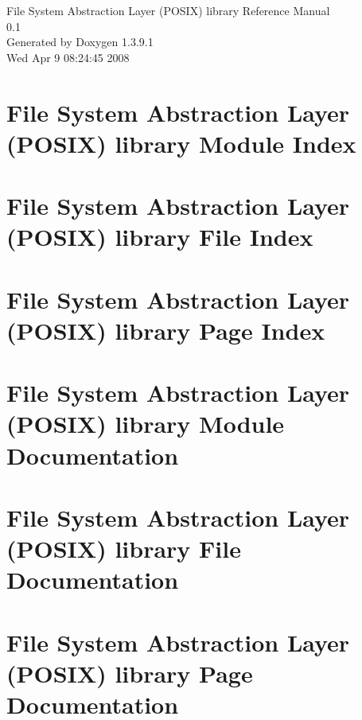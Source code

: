 \documentclass[a4paper]{book}
\begin{document}
\begin{titlepage}
\vspace*{7cm}
\begin{center}
{\Large File System Abstraction Layer (POSIX) library Reference Manual\\[1ex]\large 0.1 }\\
\vspace*{1cm}
{\large Generated by Doxygen 1.3.9.1}\\
\vspace*{0.5cm}
{\small Wed Apr 9 08:24:45 2008}\\
\end{center}
\end{titlepage}
\clearemptydoublepage
{}
\tableofcontents
\clearemptydoublepage
{}
\chapter{File System Abstraction Layer (POSIX) library Module Index}

\chapter{File System Abstraction Layer (POSIX) library File Index}

\chapter{File System Abstraction Layer (POSIX) library Page Index}

\chapter{File System Abstraction Layer (POSIX) library Module Documentation}


\chapter{File System Abstraction Layer (POSIX) library File Documentation}























\chapter{File System Abstraction Layer (POSIX) library Page Documentation}

\printindex
\end{document}
